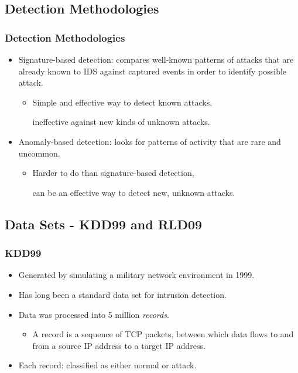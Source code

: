 \documentclass{beamer}
\newcommand{\linespace}{\vskip 0.25cm}
\begin{document}
\subsection{Detection Methodologies}
\begin{frame}
  \frametitle{Detection Methodologies}
  \begin{itemize}
  	\item Signature-based detection: compares well-known patterns of attacks
that are already known to IDS against captured events in order to identify possible attack.
	\begin{itemize}
		\item Simple and effective way to detect known attacks, 
		
		ineffective against new kinds of unknown attacks.
	\end{itemize}

\linespace
\linespace

  	\item Anomaly-based detection: looks for patterns of activity that are rare and uncommon.
	\begin{itemize}
		\item Harder to do than signature-based detection, 
		
		can be an effective way to detect new, unknown attacks.
	\end{itemize}
  \end{itemize}
\end{frame}


\subsection{Data Sets - KDD99 and RLD09}
\begin{frame}
  \frametitle{KDD99}
	\begin{itemize}
		\item Generated by simulating a military network environment in 1999.
		\item Has long been a standard data set for intrusion detection.
		
\linespace		
		
		\item Data was processed into 5 million \emph{records}.
			\begin{itemize}
				\item A record is a sequence of TCP packets, between which data flows to and from a source IP address to a target IP address.
			\end{itemize}
		\item Each record: classified as either normal or attack.
	\end{itemize}
\end{frame}
\end{document}

